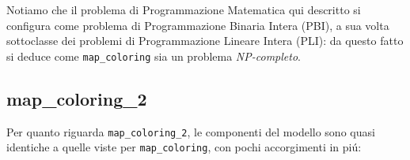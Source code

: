 \documentclass{article}
\begin{document}
Notiamo che il problema di Programmazione Matematica qui descritto si configura come problema di Programmazione Binaria Intera (PBI), a sua volta sottoclasse dei problemi di Programmazione Lineare Intera (PLI): da questo fatto si deduce come \texttt{map\_coloring} sia un problema \emph{NP-completo}.\\

\pagebreak

\subsection{map\_coloring\_2}
Per quanto riguarda \texttt{map\_coloring\_2}, le componenti del modello sono quasi identiche a quelle viste per \texttt{map\_coloring}, con pochi accorgimenti in pi\'u:\\
\end{document}
